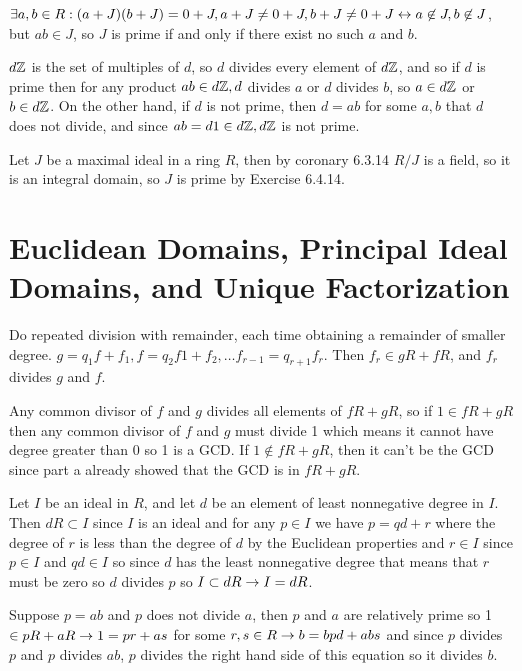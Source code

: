 \documentclass[11pt, oneside]{article}   	%
\begin{document}
\item $\exists a, b \in R: (a+J)(b+J) = 0 + J, a+J \not= 0+J, b+J \not= 0 + J \leftrightarrow a \not \in J, b \not \in J$, but $ab \in J$, so $J$ is prime if and only if there exist no such $a$ and $b$.
\item $d\mathbb{Z}$ is the set of multiples of $d$, so $d$ divides every element of $d\mathbb{Z}$, and so if $d$ is prime then for any product $ab \in d\mathbb{Z}, d$ divides $a$ or $d$ divides $b$, so $a \in d\mathbb{Z}$ or $b\in d\mathbb{Z}$. On the other hand, if $d$ is not prime, then $d=ab$ for some $a, b$ that $d$ does not divide, and since $ab = d1 \in d\mathbb{Z}, d\mathbb{Z}$ is not prime.
\item Let $J$ be a maximal ideal in a ring $R$, then by coronary 6.3.14 $R/J$ is a field, so it is an integral domain, so $J$ is prime by Exercise 6.4.14.
\ee 
\section{Euclidean Domains, Principal Ideal Domains, and Unique Factorization}
\be
\item \be
\item Do repeated division with remainder, each time obtaining a remainder of smaller degree. $g = q_1f + f_1, f = q_2 f1 + f_2, \ldots f_{r-1} = q_{r+1}f_r$. Then $f_r \in gR + fR$, and $f_r$ divides $g$ and $f$.
\item Any common divisor of $f$ and $g$ divides all elements of $fR + gR$, so if $1 \in fR + gR$ then any common divisor of $f$ and $g$ must divide 1 which means it cannot have degree greater than 0 so 1 is a GCD. If $1 \not \in fR + gR$, then it can't be the GCD since part a already showed that the GCD is in $fR + gR$.
\ee
\item \be
\item Let $I$ be an ideal in $R$, and let $d$ be an element of least nonnegative degree in $I$. Then $dR \subset I$ since $I$ is an ideal and for any $p \in I$ we have $p = qd + r$ where the degree of $r$ is less than the degree of $d$ by the Euclidean properties and $r \in I$ since $p \in I$ and $qd \in I$ so since $d$ has the least nonnegative degree that means that $r$ must be zero so $d$ divides $p$ so $I \subset dR \rightarrow I = dR$.
\item Suppose $p = ab$ and $p$ does not divide $a$, then $p$ and $a$ are relatively prime so 1 $\in pR + aR \rightarrow 1 = pr + as$ for some $r, s \in R \rightarrow b = bpd + abs$ and since $p$ divides $p$ and $p$ divides $ab$, $p$ divides the right hand side of this equation so it divides $b$.
\end{document}
